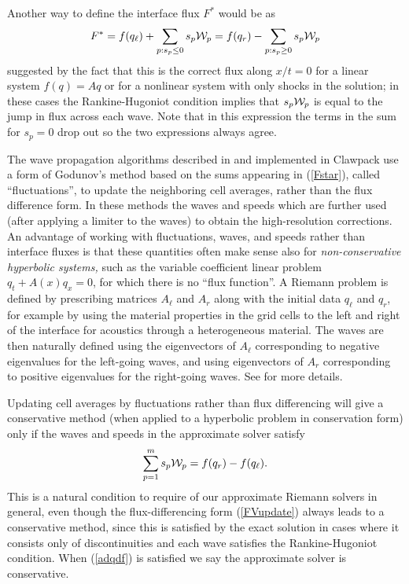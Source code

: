 \documentclass{SIAMbook2016}
\begin{document}
Another way to define the interface flux \(F^*\) would be as
\begin{align}\label{Fstar}
F^* = f(q_\ell) + \sum_{p: s_p \leq 0} s_p{\cal W}_p
= f(q_r) - \sum_{p: s_p \geq 0} s_p{\cal W}_p
\end{align} suggested by the fact that this is the correct flux along
\(x/t = 0\) for a linear system \(f(q)=Aq\) or for a nonlinear system
with only shocks in the solution; in these cases the Rankine-Hugoniot
condition implies that \(s_p{\cal W}_p\) is equal to the jump in flux
across each wave. Note that in this expression the terms in the sum for
\(s_p=0\) drop out so the two expressions always agree.

The wave propagation algorithms described in \cite{fvmhp} and
implemented in Clawpack use a form of Godunov's method based on the sums
appearing in (\ref{Fstar}), called ``fluctuations'', to update the
neighboring cell averages, rather than the flux difference form. In
these methods the waves and speeds which are further used (after
applying a limiter to the waves) to obtain the high-resolution
corrections. An advantage of working with fluctuations, waves, and
speeds rather than interface fluxes is that these quantities often make
sense also for \emph{non-conservative hyperbolic systems,} such as the
variable coefficient linear problem \(q_t + A(x)q_x = 0\), for which
there is no ``flux function''. A Riemann problem is defined by
prescribing matrices \(A_\ell\) and \(A_r\) along with the initial data
\(q_\ell\) and \(q_r\), for example by using the material properties in
the grid cells to the left and right of the interface for acoustics
through a heterogeneous material. The waves are then naturally defined
using the eigenvectors of \(A_\ell\) corresponding to negative
eigenvalues for the left-going waves, and using eigenvectors of \(A_r\)
corresponding to positive eigenvalues for the right-going waves. See
\cite{fvmhp} for more details.

Updating cell averages by fluctuations rather than flux differencing
will give a conservative method (when applied to a hyperbolic problem in
conservation form) only if the waves and speeds in the approximate
solver satisfy \begin{align}
\label{adqdf}
\sum_{p=1}^m s_p {\cal W}_p = f(q_r) - f(q_\ell).
\end{align} This is a natural condition to require of our approximate
Riemann solvers in general, even though the flux-differencing form
(\ref{FVupdate}) always leads to a conservative method, since this is
satisfied by the exact solution in cases where it consists only of
discontinuities and each wave satisfies the Rankine-Hugoniot condition.
When (\ref{adqdf}) is satisfied we say the approximate solver is
conservative.
\end{document}
